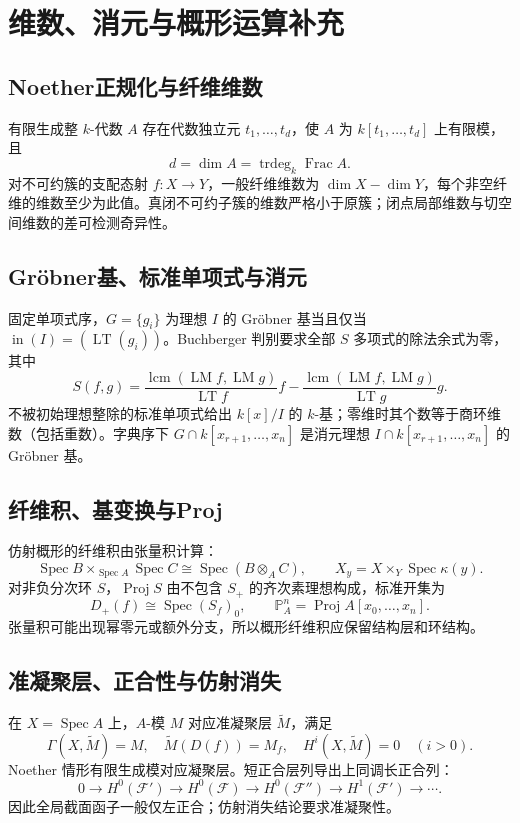 \documentclass[../main.tex]{subfiles}
\begin{document}
\section{维数、消元与概形运算补充}
\subsection{Noether正规化与纤维维数}
有限生成整 $k$-代数 $A$ 存在代数独立元 $t_1,\ldots,t_d$，使 $A$ 为 $k[t_1,\ldots,t_d]$ 上有限模，且
\[
d=\dim A=\operatorname{trdeg}_k\operatorname{Frac}A.
\]
对不可约簇的支配态射 $f:X\to Y$，一般纤维维数为 $\dim X-\dim Y$，每个非空纤维的维数至少为此值。真闭不可约子簇的维数严格小于原簇；闭点局部维数与切空间维数的差可检测奇异性。
\subsection{Gröbner基、标准单项式与消元}
固定单项式序，$G=\{g_i\}$ 为理想 $I$ 的 Gröbner 基当且仅当 $\operatorname{in}(I)=(\operatorname{LT}(g_i))$。Buchberger 判别要求全部 $S$ 多项式的除法余式为零，其中
\[
S(f,g)=\frac{\operatorname{lcm}(\operatorname{LM}f,\operatorname{LM}g)}{\operatorname{LT}f}f
-\frac{\operatorname{lcm}(\operatorname{LM}f,\operatorname{LM}g)}{\operatorname{LT}g}g.
\]
不被初始理想整除的标准单项式给出 $k[x]/I$ 的 $k$-基；零维时其个数等于商环维数（包括重数）。字典序下 $G\cap k[x_{r+1},\ldots,x_n]$ 是消元理想 $I\cap k[x_{r+1},\ldots,x_n]$ 的 Gröbner 基。
\subsection{纤维积、基变换与Proj}
仿射概形的纤维积由张量积计算：
\[
\operatorname{Spec}B\times_{\operatorname{Spec}A}\operatorname{Spec}C
\cong\operatorname{Spec}(B\otimes_AC),\qquad
X_y=X\times_Y\operatorname{Spec}\kappa(y).
\]
对非负分次环 $S$，$\operatorname{Proj}S$ 由不包含 $S_+$ 的齐次素理想构成，标准开集为
\[
D_+(f)\cong\operatorname{Spec}(S_f)_0,\qquad
\mathbb P_A^n=\operatorname{Proj}A[x_0,\ldots,x_n].
\]
张量积可能出现幂零元或额外分支，所以概形纤维积应保留结构层和环结构。
\subsection{准凝聚层、正合性与仿射消失}
在 $X=\operatorname{Spec}A$ 上，$A$-模 $M$ 对应准凝聚层 $\widetilde M$，满足
\[
\Gamma(X,\widetilde M)=M,\quad\widetilde M(D(f))=M_f,\quad
H^i(X,\widetilde M)=0\quad(i>0).
\]
Noether 情形有限生成模对应凝聚层。短正合层列导出上同调长正合列：
\[
0\to H^0(\mathcal F')\to H^0(\mathcal F)\to H^0(\mathcal F'')
\to H^1(\mathcal F')\to\cdots.
\]
因此全局截面函子一般仅左正合；仿射消失结论要求准凝聚性。
\end{document}
